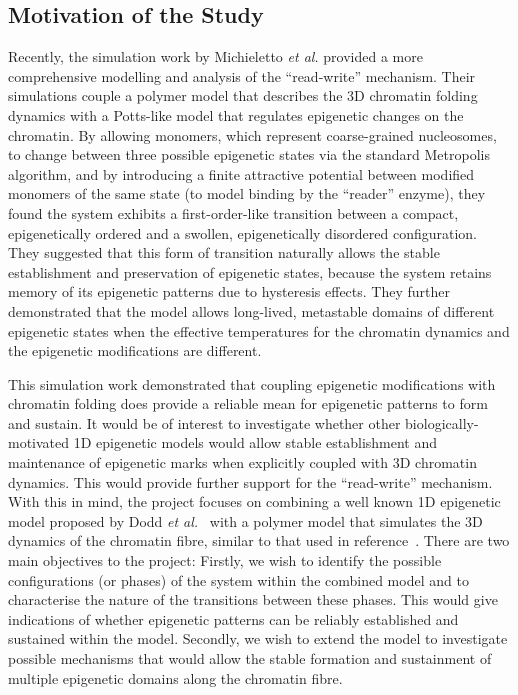 \documentclass[12pt]{article}
\newcommand{\etal}{\emph{et al.}}
\begin{document}
\subsection{Motivation of the Study}
Recently, the simulation work by Michieletto \etal\cite{michieletto2016} provided a more comprehensive modelling and analysis of the ``read-write'' mechanism. Their simulations couple a polymer model that describes the 3D chromatin folding dynamics with a Potts-like model that regulates epigenetic changes on the chromatin.  By allowing monomers, which represent coarse-grained nucleosomes, to change between three possible epigenetic states via the standard Metropolis algorithm, and by introducing a finite attractive potential between modified monomers of the same state (to model binding by the ``reader'' enzyme), they found the system exhibits a first-order-like transition between a compact, epigenetically ordered and a swollen, epigenetically disordered configuration. They suggested that this form of transition naturally allows the stable establishment and preservation of epigenetic states, because the system retains memory of its epigenetic patterns due to hysteresis effects. They further demonstrated that the model allows long-lived, metastable domains of different epigenetic states when the effective temperatures for the chromatin dynamics and the epigenetic modifications are different. 

This simulation work demonstrated that coupling epigenetic modifications with chromatin folding does provide a reliable mean for epigenetic patterns to form and sustain. It would be of interest to investigate whether other biologically-motivated 1D epigenetic models would allow stable establishment and maintenance of epigenetic marks when explicitly coupled with 3D chromatin dynamics. This would provide further support for the ``read-write'' mechanism. With this in mind, the project focuses on combining a well known 1D epigenetic model proposed by Dodd \etal~\cite{dodd2007} with a polymer model that simulates the 3D dynamics of the chromatin fibre, similar to that used in reference~\cite{brackley2013, michieletto2016}. There are two main objectives to the project: Firstly, we wish to identify the possible configurations (or phases) of the system within the combined model and to characterise the nature of the transitions between these phases. This would give indications of whether epigenetic patterns can be reliably established and sustained within the model. Secondly, we wish to extend the model to investigate possible mechanisms that would allow the stable formation and sustainment of multiple epigenetic domains along the chromatin fibre. 
\end{document}
